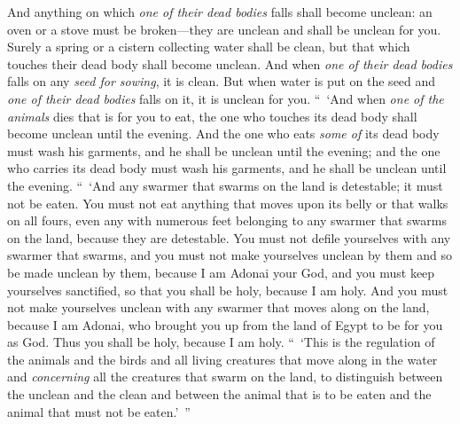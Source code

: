 \begin{biblechapter}
\verse And anything on which \textit{one of their dead bodies} falls shall become unclean: an oven or a stove must be broken—they are unclean and shall be unclean for you.
\verse Surely a spring or a cistern collecting water shall be clean, but that which touches their dead body shall become unclean.
\verse And when \textit{one of their dead bodies} falls on any \textit{seed for sowing}, it is clean.
\verse But when water is put on the seed and \textit{one of their dead bodies} falls on it, it is unclean for you.
\verse “ ‘And when \textit{one of the animals} dies that is for you to eat, the one who touches its dead body shall become unclean until the evening.
\verse And the one who eats \textit{some of} its dead body must wash his garments, and he shall be unclean until the evening; and the one who carries its dead body must wash his garments, and he shall be unclean until the evening.
\verse “ ‘And any swarmer that swarms on the land is detestable; it must not be eaten.
\verse You must not eat anything that moves upon its belly or that walks on all fours, even any with numerous feet belonging to any swarmer that swarms on the land, because they are detestable.
\verse You must not defile yourselves with any swarmer that swarms, and you must not make yourselves unclean by them and so be made unclean by them,
\verse because I am Adonai your God, and you must keep yourselves sanctified, so that you shall be holy, because I am holy. And you must not make yourselves unclean with any swarmer that moves along on the land,
\verse because I am Adonai, who brought you up from the land of Egypt to be for you as God. Thus you shall be holy, because I am holy.
\verse “ ‘This is the regulation of the animals and the birds and all living creatures that move along in the water and \textit{concerning} all the creatures that swarm on the land,
\verse to distinguish between the unclean and the clean and between the animal that is to be eaten and the animal that must not be eaten.’ ”
\end{biblechapter}

